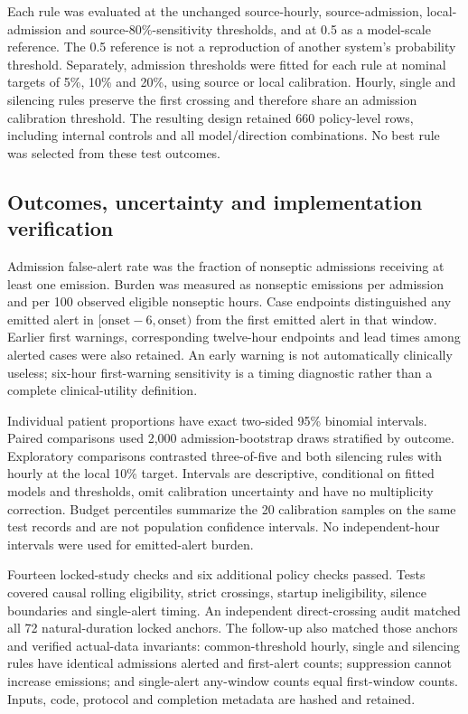 \documentclass[11pt,a4paper]{article}
\begin{document}
Each rule was evaluated at the unchanged source-hourly, source-admission, local-admission and source-80\%-sensitivity thresholds, and at 0.5 as a model-scale reference. The 0.5 reference is not a reproduction of another system's probability threshold. Separately, admission thresholds were fitted for each rule at nominal targets of 5\%, 10\% and 20\%, using source or local calibration. Hourly, single and silencing rules preserve the first crossing and therefore share an admission calibration threshold. The resulting design retained 660 policy-level rows, including internal controls and all model/direction combinations. No best rule was selected from these test outcomes.

\subsection{Outcomes, uncertainty and implementation verification}
Admission false-alert rate was the fraction of nonseptic admissions receiving at least one emission. Burden was measured as nonseptic emissions per admission and per 100 observed eligible nonseptic hours. Case endpoints distinguished any emitted alert in $[\mathrm{onset}-6,\mathrm{onset})$ from the first emitted alert in that window. Earlier first warnings, corresponding twelve-hour endpoints and lead times among alerted cases were also retained. An early warning is not automatically clinically useless; six-hour first-warning sensitivity is a timing diagnostic rather than a complete clinical-utility definition.

Individual patient proportions have exact two-sided 95\% binomial intervals. Paired comparisons used 2,000 admission-bootstrap draws stratified by outcome. Exploratory comparisons contrasted three-of-five and both silencing rules with hourly at the local 10\% target. Intervals are descriptive, conditional on fitted models and thresholds, omit calibration uncertainty and have no multiplicity correction. Budget percentiles summarize the 20 calibration samples on the same test records and are not population confidence intervals. No independent-hour intervals were used for emitted-alert burden.

Fourteen locked-study checks and six additional policy checks passed. Tests covered causal rolling eligibility, strict crossings, startup ineligibility, silence boundaries and single-alert timing. An independent direct-crossing audit matched all 72 natural-duration locked anchors. The follow-up also matched those anchors and verified actual-data invariants: common-threshold hourly, single and silencing rules have identical admissions alerted and first-alert counts; suppression cannot increase emissions; and single-alert any-window counts equal first-window counts. Inputs, code, protocol and completion metadata are hashed and retained.
\end{document}
